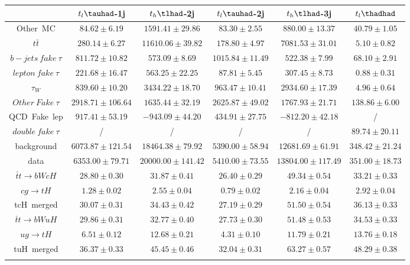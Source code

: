 \centering
\begin{tabular}{cccccc} \toprule\toprule
 & $t_{l}\tauhad$-1j & $t_{h}\tlhad$-2j & $t_{l}\tauhad$-2j & $t_{h}\tlhad$-3j & $t_{l}\thadhad$\\\midrule
Other~MC & $84.62\pm6.19$ & $1591.41\pm29.86$ & $83.30\pm2.55$ & $880.00\pm13.37$ & $40.79\pm1.05$\\
$t\bar{t}$ & $280.14\pm6.27$ & $11610.06\pm39.82$ & $178.80\pm4.97$ & $7081.53\pm31.01$ & $5.10\pm0.82$\\
$b-jets~fake~\tau$ & $811.72\pm10.82$ & $573.09\pm8.69$ & $1015.84\pm11.49$ & $522.38\pm7.99$ & $68.10\pm2.91$\\
$lepton~fake~\tau$ & $221.68\pm16.47$ & $563.25\pm22.25$ & $87.81\pm5.45$ & $307.45\pm8.73$ & $0.88\pm0.31$\\
$\tau_{W}$ & $839.60\pm10.20$ & $3434.22\pm18.70$ & $963.47\pm10.41$ & $2934.60\pm17.39$ & $4.96\pm0.64$\\
$Other~Fake~\tau$ & $2918.71\pm106.64$ & $1635.44\pm32.19$ & $2625.87\pm49.02$ & $1767.93\pm21.71$ & $138.86\pm6.00$\\
QCD~Fake~lep & $917.41\pm53.19$ & $-943.09\pm44.20$ & $434.91\pm27.75$ & $-812.20\pm42.18$ &  /\\
$double~fake~\tau$ &  / &  / &  / &  / & $89.74\pm20.11$\\
background & $6073.87\pm121.54$ & $18464.38\pm79.92$ & $5390.00\pm58.94$ & $12681.69\pm61.91$ & $348.42\pm21.24$\\
data & $6353.00\pm79.71$ & $20000.00\pm141.42$ & $5410.00\pm73.55$ & $13804.00\pm117.49$ & $351.00\pm18.73$\\
$\bar{t}t\to bWcH$ & $28.80\pm0.30$ & $31.87\pm0.41$ & $26.40\pm0.29$ & $49.34\pm0.54$ & $33.21\pm0.33$\\
$cg\to tH$ & $1.28\pm0.02$ & $2.55\pm0.04$ & $0.79\pm0.02$ & $2.16\pm0.04$ & $2.92\pm0.04$\\
tcH~merged & $30.07\pm0.31$ & $34.43\pm0.42$ & $27.19\pm0.29$ & $51.50\pm0.54$ & $36.13\pm0.33$\\
$\bar{t}t\to bWuH$ & $29.86\pm0.31$ & $32.77\pm0.40$ & $27.73\pm0.30$ & $51.48\pm0.53$ & $34.53\pm0.33$\\
$ug\to tH$ & $6.51\pm0.12$ & $12.68\pm0.21$ & $4.31\pm0.10$ & $11.79\pm0.21$ & $13.76\pm0.18$\\
tuH~merged & $36.37\pm0.33$ & $45.45\pm0.46$ & $32.04\pm0.31$ & $63.27\pm0.57$ & $48.29\pm0.38$\\
\bottomrule\bottomrule\\
\end{tabular}
